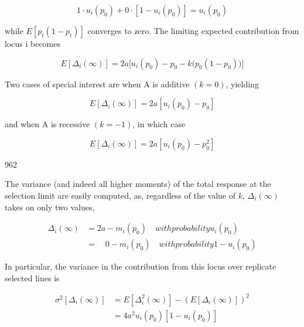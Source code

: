 \documentclass{article}
\begin{document}
\begin{equation}
1\cdot u_{i}(p_{0})+0\cdot\left[1-u_{i}(p_{0})\right]=u_{i}(p_{0})
\end{equation}

while  $ E[p_t(1-p_t)] $ converges to zero. The limiting expected contribution from locus i becomes

\begin{equation}
E[\Delta_{i}(\infty)]=2a\bigg[u_{i}(p_{0})-p_{0}-k\bigg(p_{0}(1-p_{0})\bigg)\bigg]
\tag{26.11a}
\label{eq:26_11a}
\end{equation}

Two cases of special interest are when A is additive  $ (k = 0) $, yielding

\begin{equation}
E[\Delta_{i}(\infty)]=2a\left[u_{i}(p_{0})-p_{0}\right]
\tag{26.11b}
\label{eq:26_11b}
\end{equation}

and when A is recessive  $ (k = -1) $, in which case

\begin{equation}
E[\Delta_{i}(\infty)]=2a\left[u_{i}(p_{0})-p_{0}^{2}\right]
\tag{26.11c}
\label{eq:26_11c}
\end{equation}

962

The variance (and indeed all higher moments) of the total response at the selection limit are easily computed, as, regardless of the value of  $ k $,  $ \Delta_{i}(\infty) $ takes on only two values,

\begin{equation}
\begin{aligned}\Delta_{i}(\infty)&=2a-m_{i}(p_{0})\quad with probability u_{i}(p_{0})\\&=\quad0-m_{i}(p_{0})\quad with probability1-u_{i}(p_{0})\end{aligned}
\tag{26.12}
\label{eq:26_12}
\end{equation}

In particular, the variance in the contribution from this locus over replicate selected lines is

\begin{equation}
\begin{aligned}\sigma^{2}\left[\Delta_{i}(\infty)\right]&=E\left[\Delta_{i}^{2}(\infty)\right]-\left(E\left[\Delta_{i}(\infty)\right]\right)^{2}\\&=4a^{2}u_{i}(p_{0})\left[1-u_{i}(p_{0})\right]\end{aligned}
\tag{26.13a}
\label{eq:26_13a}
\end{equation}
\end{document}
